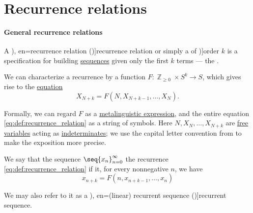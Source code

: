 \section{Recurrence relations}\label{sec:recurrence_relations}

\paragraph{General recurrence relations}

\begin{definition}\label{def:recurrence_relation}\mimprovised
  A \term[ru=рекуррентное уравнение (\cite[21]{Юмагулов2015ДинамическиеСистемы}), en=recurrence relation (\cite[def. 2.4.4]{Rosen2019DiscreteMathematics})]{recurrence relation} or simply a  of \term[en=order (of linear recurring sequence) (\cite[395]{LidlNiederreiter1997FiniteFields})]{order} \( k \) is a specification for building \hyperref[def:sequence]{sequences} given only the first \( k \) terms --- the .

  We can characterize a recurrence by a function \( F: \BbbZ_{\geq 0} \times S^k \to S \), which gives rise to the \hyperref[def:equation]{equation}
  \begin{equation}\label{eq:def:recurrence_relation}
    X_{N+k} = F(N, X_{N+k-1}, \ldots, X_N).
  \end{equation}

  Formally, we can regard \( F \) as a \hyperref[con:expression]{metalinguistic expression}, and the entire equation \eqref{eq:def:recurrence_relation} as a string of symbols. Here \( N, X_N, \ldots, X_{N+k} \) are \hyperref[con:variable_binding]{free variables} acting as \hyperref[con:indeterminate]{indeterminates}; we use the capital letter convention from  to make the exposition more precise.

  \begin{thmenum}
     We say that the sequence \( \seq{ x_n }_{n=0}^\infty \)  the recurrence \eqref{eq:def:recurrence_relation} if it, for every nonnegative \( n \), we have
    \begin{equation}\label{eq:def:recurrence_relation/sequence}
      x_{n+k} = F(n, x_{n+k-1}, \ldots, x_n)
    \end{equation}

    We may also refer to it as a \term[ru=рекуррентная последовательность (\cite[21]{Юмагулов2015ДинамическиеСистемы}), en=(linear) recurrent sequence (\cite[395]{LidlNiederreiter1997FiniteFields})]{recurrent sequence}.


\end{thmenum}
\end{definition}
